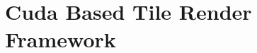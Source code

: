 \documentclass{si_template/cn_book}
\begin{document}
\frontmatter
\mainmatter

\chapter{Cuda Based Tile Render Framework}


\backmatter
\end{document}
